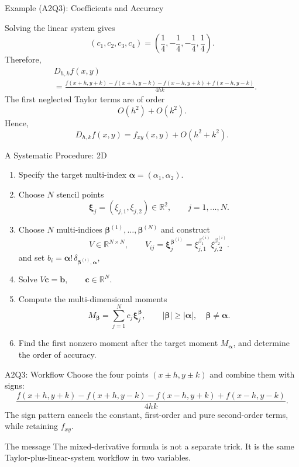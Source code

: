 \documentclass{beamer}
\begin{document}
\begin{frame}{Example (A2Q3): Coefficients and Accuracy}

Solving the linear system gives
\[
(c_1,c_2,c_3,c_4)
=
\left(
\frac14,-\frac14,-\frac14,\frac14
\right).
\]
Therefore,
\[
\begin{aligned}
&D_{h,k}f(x,y)\\
&=
\frac{
f(x+h,y+k)-f(x+h,y-k)
-f(x-h,y+k)+f(x-h,y-k)
}{4hk}.   
\end{aligned}
\]
The first neglected Taylor terms are of order
\[
O(h^2)+O(k^2).
\]
Hence,
\[
\boxed{
D_{h,k}f(x,y)
=
f_{xy}(x,y)+O(h^2+k^2).
}
\]
\end{frame}

\begin{frame}{A Systematic Procedure: 2D}

\small
\setlength{\itemsep}{2pt}

\begin{enumerate}
    \item Specify the target multi-index $\boldsymbol{\alpha}=(\alpha_1,\alpha_2).$
    \item Choose \(N\) stencil points
    \[
    \boldsymbol{\xi}_j
    =
    (\xi_{j,1},\xi_{j,2})
    \in\mathbb{R}^2,
    \qquad j=1,\ldots,N.
    \]

    \item Choose \(N\) multi-indices $\boldsymbol{\beta}^{(1)},\ldots,
    \boldsymbol{\beta}^{(N)}$ and construct
    \[
    V\in\mathbb{R}^{N\times N},
    \qquad
    V_{ij}
    =
    \boldsymbol{\xi}_j^{\boldsymbol{\beta}^{(i)}}
    =
    \xi_{j,1}^{\beta^{(i)}_1}
    \xi_{j,2}^{\beta^{(i)}_2}.
    \]
    and set $    b_i
    =
    \boldsymbol{\alpha}!\,
    \delta_{\boldsymbol{\beta}^{(i)},\boldsymbol{\alpha}},$
    \item Solve $V\boldsymbol c=\boldsymbol b,
    \qquad
    \boldsymbol c\in\mathbb{R}^N.$

\item Compute the multi-dimensional moments
\[
M_{\boldsymbol{\beta}}
=
\sum_{j=1}^N
c_j\boldsymbol{\xi}_j^{\boldsymbol{\beta}},
\qquad
|\boldsymbol{\beta}|\geq|\boldsymbol{\alpha}|,
\quad
\boldsymbol{\beta}\neq\boldsymbol{\alpha}.
\]
    \item Find the first nonzero moment after the target moment
    \(M_{\boldsymbol{\alpha}}\), and determine the order of accuracy.
\end{enumerate}
\end{frame}

\begin{frame}{A2Q3: Workflow}
Choose the four points $(x\pm h,y\pm k)$ and combine them with signs:
\[
\frac{f(x+h,y+k)-f(x+h,y-k)
-f(x-h,y+k)+f(x-h,y-k)}{4hk}.
\]
The sign pattern cancels the constant, first-order and pure second-order terms, while retaining $f_{xy}$.
\begin{block}{The message}
The mixed-derivative formula is not a separate trick. It is the same Taylor-plus-linear-system workflow in two variables.
\end{block}
\end{frame}
\end{document}
